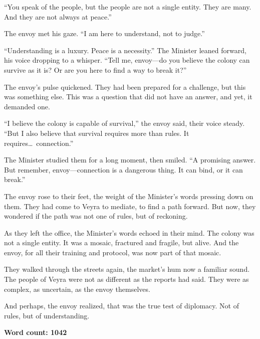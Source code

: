 \documentclass{article}
\theoremstyle{plain}
\theoremstyle{definition}
\theoremstyle{remark}
\begin{document}
\begin{tcolorbox}[colback=red!3, colframe=red!40!black, title=\textbf{Qwen3-4B (Base)}, fonttitle=\bfseries, left=2mm, right=2mm, breakable]
``You speak of the people, but the people are not a single entity. They are many. And they are not always at peace.''  

The envoy met his gaze. ``I am here to understand, not to judge.''  

``Understanding is a luxury. Peace is a necessity.'' The Minister leaned forward, his voice dropping to a whisper. ``Tell me, envoy---do you believe the colony can survive as it is? Or are you here to find a way to break it?''  

The envoy’s pulse quickened. They had been prepared for a challenge, but this was something else. This was a question that did not have an answer, and yet, it demanded one.  

``I believe the colony is capable of survival,'' the envoy said, their voice steady. ``But I also believe that survival requires more than rules. It requires\dots\ connection.''  

The Minister studied them for a long moment, then smiled. ``A promising answer. But remember, envoy---connection is a dangerous thing. It can bind, or it can break.''  

The envoy rose to their feet, the weight of the Minister’s words pressing down on them. They had come to Veyra to mediate, to find a path forward. But now, they wondered if the path was not one of rules, but of reckoning.  

As they left the office, the Minister’s words echoed in their mind. The colony was not a single entity. It was a mosaic, fractured and fragile, but alive. And the envoy, for all their training and protocol, was now part of that mosaic.  

They walked through the streets again, the market’s hum now a familiar sound. The people of Veyra were not as different as the reports had said. They were as complex, as uncertain, as the envoy themselves.  

And perhaps, the envoy realized, that was the true test of diplomacy. Not of rules, but of understanding.

\vspace{0.5em}

\textbf{Word count: 1042}

\end{tcolorbox}
\end{document}
